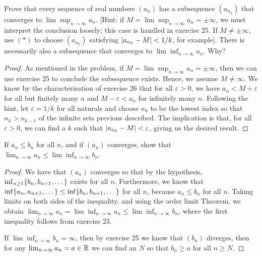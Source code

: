 \begin{exercise}{27}
Prove that every sequence of real numbers $(a_n)$ has a subsequence $(a_{n_k})$ that converges to $\lim\sup_{n\to\infty}a_n$. [Hint: if $M=\lim\sup_{n\to\infty}a_n=\pm\infty$, we must interpret the conclusion loosely; this case is handled in exercise 25. If $M\neq\pm\infty$, use $(\ast)$ to choose $(a_{n_k})$ satisfying $\left\lvert a_{n_k}-M\right\rvert<1/k$, for example]. There is necessarily also a subsequence that converges to $\lim\inf_{n\to\infty}a_n$. Why?
\end{exercise}
\begin{proof}
As mentioned in the problem, if $M=\lim\sup_{n\to\infty}a_n=\pm\infty$, then we can use exercise 25 to conclude the subsequence exists. Hence, we assume $M\neq\infty$. We know by the characterisation of exercise 26 that for all $\varepsilon>0$, we have $a_n<M+\varepsilon$ for all but finitely many $n$ and $M-\varepsilon<a_n$ for infinitely many $n$. Following the hint, let $\varepsilon=1/k$ for all naturals and choose $n_k$ to be the lowest index so that $n_k>n_{k-1}$ of the infinite sets previous described. The implication is that, for all $\varepsilon>0$, we can find a $k$ such that $\left\lvert a_{n_k}-M\right\rvert<\varepsilon$, giving us the desired result.
\end{proof}

\begin{exercise}{30}
If $a_n\leq b_n$ for all $n$, and if $(a_n)$ converges, show that $\lim_{n\to\infty}a_n\leq\lim\inf_{n\to\infty}b_n$.
\end{exercise}
\begin{proof}
We have that $(a_n)$ converges so that by the hypothesis, $\inf_{n\geq 1}\{b_n,b_{n+1},\dots\}$ exists for all $n$. Furthermore, we know that $\inf\{a_n,a_{n+1},\dots\}\leq\inf\{b_n,b_{n+1},\dots\}$ for all $n$, because $a_n\leq b_n$ for all $n$. Taking limits on both sides of the inequality, and using the order limit Theorem, we obtain $\lim_{n\to\infty}a_n=\lim\inf_{n\to\infty}a_n\leq\lim\inf_{n\to\infty}b_n$, where the first inequality follows from exercise 23.

If $\lim\inf_{n\to\infty}b_n=\infty$, then by exercise 25 we know that $(b_n)$ diverges, then for any $\lim_{n\to\infty}a_n=a\in\mathbb{R}$ we can find an $N$ so that $b_n\geq a$ for all $n\geq N$.
\end{proof}

